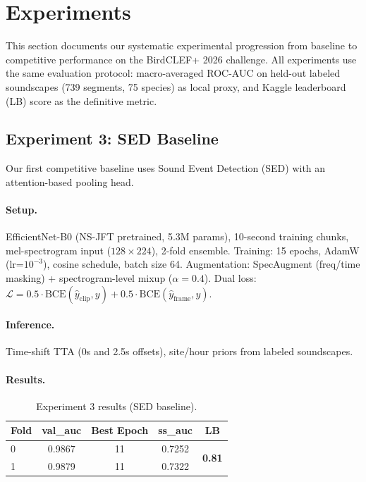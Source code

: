 \section{Experiments}
\label{sec:experiments}

This section documents our systematic experimental progression from baseline
to competitive performance on the BirdCLEF+ 2026 challenge.
All experiments use the same evaluation protocol: macro-averaged ROC-AUC on
held-out labeled soundscapes (739 segments, 75 species) as local proxy,
and Kaggle leaderboard (LB) score as the definitive metric.

\subsection{Experiment 3: SED Baseline}
\label{sec:exp3}

Our first competitive baseline uses Sound Event Detection (SED) with an
attention-based pooling head.

\paragraph{Setup.}
EfficientNet-B0 (NS-JFT pretrained, 5.3M params), 10-second training chunks,
mel-spectrogram input ($128 \times 224$), 2-fold ensemble.
Training: 15 epochs, AdamW (lr=$10^{-3}$), cosine schedule, batch size 64.
Augmentation: SpecAugment (freq/time masking) + spectrogram-level mixup ($\alpha=0.4$).
Dual loss: $\mathcal{L} = 0.5 \cdot \text{BCE}(\hat{y}_\text{clip}, y) + 0.5 \cdot \text{BCE}(\hat{y}_\text{frame}, y)$.

\paragraph{Inference.}
Time-shift TTA (0s and 2.5s offsets), site/hour priors from labeled soundscapes.

\paragraph{Results.}
\begin{table}[h]
\centering
\caption{Experiment 3 results (SED baseline).}
\label{tab:exp3}
\begin{tabular}{lcccc}
\hline
\textbf{Fold} & \textbf{val\_auc} & \textbf{Best Epoch} & \textbf{ss\_auc} & \textbf{LB} \\
\hline
0 & 0.9867 & 11 & 0.7252 & \multirow{2}{*}{\textbf{0.81}} \\
1 & 0.9879 & 11 & 0.7322 & \\
\hline
\end{tabular}
\end{table}

